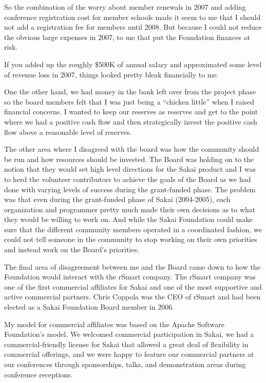 \documentclass[12pt]{book}
\begin{document}
So the combination of the worry about member renewals in 2007 and adding conference
registration cost for member schools made it seem to me that I should not
add a registration fee for members until 2008.  But because I could not reduce
the obvious large expenses in 2007, to me that put the Foundation finances at risk.

If you added up the roughly \$500K of annual salary and approximated
some level of revenue loss in 2007, things looked pretty bleak financially to me.

One the other hand, we had money in the bank left over from the project phase so
the board members felt that I was just being a ``chicken little'' when I raised
financial concerns.  I wanted to keep our reserves as reserves and get to the point
where we had a positive cash flow and then strategically invest the positive cash
flow above a reasonable level of reserves.

The other area where I disagreed with the board was how the community should be
run and how resources should be invested.  The Board was holding on to the notion that
they would set high level directions for the Sakai product and I was to herd
the volunteer contributors to achieve the goals of the Board as we had done with
varying levels of success during
the grant-funded phase.   The problem was that even during the grant-funded phase
of Sakai (2004-2005), each organization and programmer pretty much made their
own decisions as to what they would be willing to work on.   And while the Sakai
Foundation could make sure that the different community members operated in a
coordinated fashion, we could not tell someone in the community to stop working
on their own priorities and instead work on the Board's priorities.

The final area of disagreement between me and the Board came down to how the
Foundation would interact with the rSmart company.  The rSmart company was one
of the first commercial affiliates for Sakai and one of the most supportive and
active commercial partners.   Chris Coppola was the CEO of rSmart and had been
elected as a Sakai Foundation Board member in 2006.

My model for commercial affiliates was based on the Apache Software Foundation's
model.   We welcomed commercial participation in Sakai, we had a
commercial-friendly license for Sakai that allowed a great deal of flexibility
in commercial offerings, and we were happy to feature our commercial partners
at our conferences through sponsorships, talks, and demonstration areas during
conference receptions.
\end{document}
